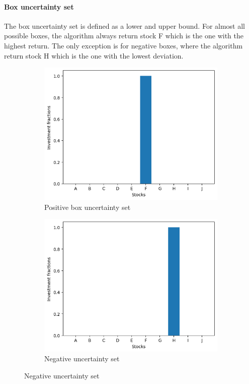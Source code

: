 \paragraph*{Box uncertainty set}
The box uncertainty set is defined as a lower and upper bound. For almost all possible boxes, the algorithm always return stock F which is the one with the highest return. The only exception is for negative boxes, where the algorithm return stock H which is the one with the lowest deviation.
\begin{figure}[H]
    \begin{subfigure}{0.5\textwidth}
        \includegraphics[width=\textwidth]{lab12/imgs/pos_bounds.png}
        \caption{Positive box uncertainty set}
    \end{subfigure}
    \begin{subfigure}{0.5\textwidth}
        \includegraphics[width=\textwidth]{lab12/imgs/neg_bounds.png}
        \caption{Negative  uncertainty set}
    \end{subfigure}
    \label{fig:box}
\end{figure}

